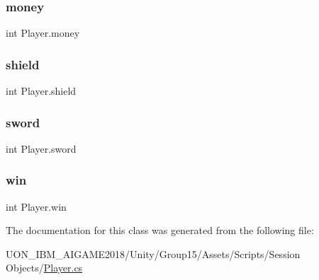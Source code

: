 \mbox{\label{class_player_aed37167e4117c2518a154e73fbfc103c}} 
\subsubsection{\texorpdfstring{money}{money}}
{\footnotesize\ttfamily int Player.\+money\hspace{0.3cm}{\ttfamily [private]}}

\mbox{\label{class_player_af31f60ef7eedd89486623f26edb2b990}} 
\subsubsection{\texorpdfstring{shield}{shield}}
{\footnotesize\ttfamily int Player.\+shield\hspace{0.3cm}{\ttfamily [private]}}

\mbox{\label{class_player_aa6c1d9c5753ea9a365f28eac36238d1f}} 
\subsubsection{\texorpdfstring{sword}{sword}}
{\footnotesize\ttfamily int Player.\+sword}

\mbox{\label{class_player_a9abe91f5084f15d7a11c7a77f345e517}} 
\subsubsection{\texorpdfstring{win}{win}}
{\footnotesize\ttfamily int Player.\+win\hspace{0.3cm}{\ttfamily [private]}}



The documentation for this class was generated from the following file\+:\begin{DoxyCompactItemize}
\item 
U\+O\+N\+\_\+\+I\+B\+M\+\_\+\+A\+I\+G\+A\+M\+E2018/\+Unity/\+Group15/\+Assets/\+Scripts/\+Session Objects/\mbox{\hyperlink{_player_8cs}{Player.\+cs}}\end{DoxyCompactItemize}
